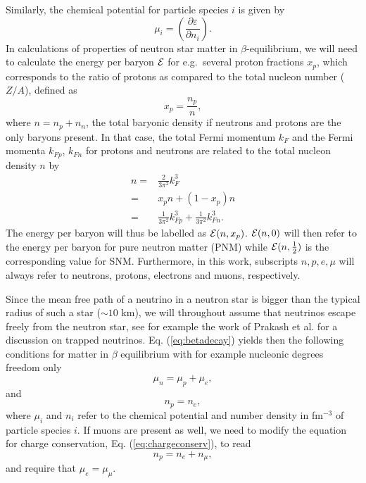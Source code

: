 Similarly, the chemical potential for particle species $i$
is given by
\begin{equation}
     \mu_i = \left(\frac{\partial \varepsilon}{\partial n_i}\right).
     \label{eq:chemicalpotdef}
\end{equation}
In calculations of properties of neutron star matter in $\beta$-equilibrium,
we will need to calculate the energy per baryon ${\cal E}$ for e.g.~several 
proton fractions $x_p$, which corresponds to
the ratio of protons as
compared to the total nucleon number ($Z/A$), 
 defined as
\begin{equation}
    x_p = \frac{n_p}{n},
\end{equation}
where $n=n_p+n_n$, the total baryonic density if neutrons and
protons are the only baryons present. In that case,
the total Fermi momentum $k_F$ and the Fermi momenta $k_{Fp}$,
$k_{Fn}$ for protons and neutrons are related to the total nucleon density
$n$ by
\begin{align}
     n = & \frac{2}{3\pi^2} k_F^3 \nonumber \\
       = & x_p n + (1-x_p) n \nonumber \\
       = & \frac{1}{3\pi^2} k_{Fp}^3 + \frac{1}{3\pi^2} k_{Fn}^3.
    \label{eq:densi}
\end{align}
The energy per baryon will thus be
labelled as ${\cal E}(n,x_p)$.
${\cal E}(n,0)$ will then refer to the energy per baryon for pure neutron
matter (PNM) while ${\cal E}(n,\frac{1}{2})$ is the corresponding value for 
SNM. Furthermore, in this work, subscripts $n,p,e,\mu$
will always refer to neutrons, protons, electrons and muons, respectively.


Since the mean free path of a neutrino in a neutron star is bigger
than the typical radius of such a star ($\sim 10$ km), 
we will throughout assume that neutrinos escape freely from the neutron star,
see for example  the work of Prakash et al.
for a discussion
on trapped neutrinos. Eq. (\ref{eq:betadecay}) yields then the following
conditions for matter in $\beta$ equilibrium with for example  nucleonic degrees 
freedom only
\begin{equation}
    \mu_n=\mu_p+\mu_e,
     \label{eq:npebetaequilibrium}
\end{equation}
and 
\begin{equation}
     n_p = n_e,
     \label{eq:chargeconserv}
\end{equation}
where $\mu_i$ and $n_i$ refer to the chemical potential and number density
in fm$^{-3}$ of particle species $i$. 
If muons are present as well,  we need to modify the equation for 
charge conservation, Eq. (\ref{eq:chargeconserv}), to read 
\[
     n_p = n_e+n_{\mu},
\]
and require that $\mu_e = \mu_{\mu}$.

